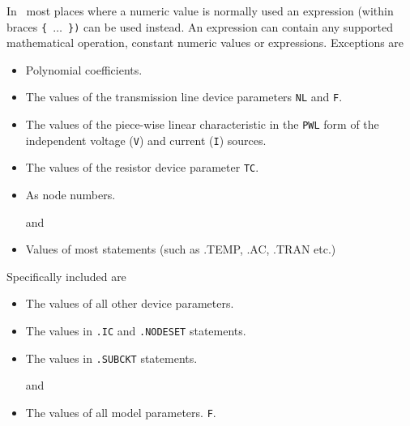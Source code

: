 In \pspice\ most places where a numeric value is normally used
an expression (within braces {\tt \{ $\ldots$ \})} can be used instead.
An expression can contain any supported mathematical operation, constant numeric
values or expressions. Exceptions are 
     \begin{itemize}
     \item Polynomial coefficients.
     \item The values of the transmission line device parameters {\tt NL} and
           {\tt F}.
     \item The values of the piece-wise linear characteristic in the {\tt PWL}
           form of the independent voltage ({\tt V}) and current ({\tt I})
           sources.
     \item The values of the resistor device parameter {\tt TC}.
     \item As node numbers.
     \item[and]
     \item Values of most statements (such as .TEMP, .AC, .TRAN etc.)
     \end{itemize}
Specifically included are
     \begin{itemize}
     \item The values of all other device parameters.
     \item The values in {\tt .IC} and {\tt .NODESET} statements.
     \item The values in {\tt .SUBCKT} statements.
     \item[and]
     \item The values of all model parameters.
           {\tt F}.
     \end{itemize}

